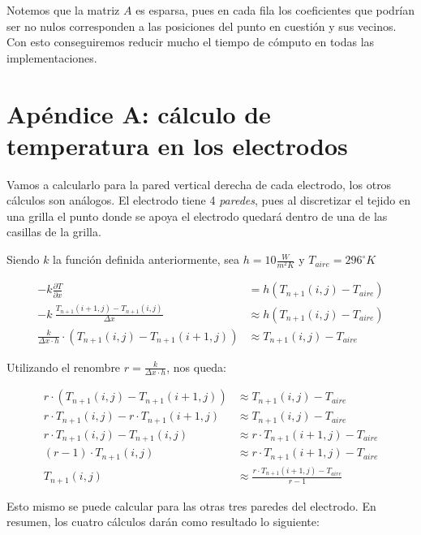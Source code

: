 \documentclass[a4paper]{article}
\begin{document}
Notemos que la matriz $A$ es esparsa, pues en cada fila los coeficientes que podrían ser no nulos corresponden a las posiciones del punto en cuestión y sus vecinos. Con esto conseguiremos reducir mucho el tiempo de cómputo en todas las implementaciones.

\newpage
\section{Apéndice A: cálculo de temperatura en los electrodos}

Vamos a calcularlo para la pared vertical derecha de cada electrodo, los otros cálculos son análogos. El electrodo tiene 4 \textit{paredes}, pues al discretizar el tejido en una grilla el punto donde se apoya el electrodo quedará dentro de una de las casillas de la grilla.

Siendo $k$ la función definida anteriormente, sea $h = 10 \frac{W}{m^2 K}$ y $T_{aire} = 296 ^\circ K$

\begin{equation*}
\begin{aligned}
-k \frac{\partial T}{\partial x} & = h (T_{n+1}(i,j) -  T_{aire}) \\
-k \ \frac{T_{n+1}(i+1,j) - T_{n+1}(i,j)}{\Delta x} & \approx h (T_{n+1}(i,j) -  T_{aire}) \\
\frac{k}{\Delta x \cdot h} \cdot (T_{n+1}(i,j) - T_{n+1}(i+1,j)) & \approx T_{n+1}(i,j) -  T_{aire}
\end{aligned}
\end{equation*}

Utilizando el renombre $r = \frac{k}{\Delta x \cdot h}$, nos queda:

\begin{equation*}
\begin{aligned}
r \cdot (T_{n+1}(i,j) - T_{n+1}(i+1,j)) & \approx T_{n+1}(i,j) - T_{aire} \\
r \cdot T_{n+1}(i,j) - r \cdot T_{n+1}(i+1,j) & \approx T_{n+1}(i,j) - T_{aire} \\
r \cdot T_{n+1}(i,j) - T_{n+1}(i,j) & \approx r \cdot T_{n+1}(i+1,j) - T_{aire} \\
(r - 1) \cdot T_{n+1}(i,j) & \approx r \cdot T_{n+1}(i+1,j) - T_{aire} \\
T_{n+1}(i,j) & \approx \frac{r \cdot T_{n+1}(i+1,j) - T_{aire}}{r-1}
\end{aligned}
\end{equation*}

Esto mismo se puede calcular para las otras tres paredes del electrodo. En resumen, los cuatro cálculos darán como resultado lo siguiente:
\end{document}
